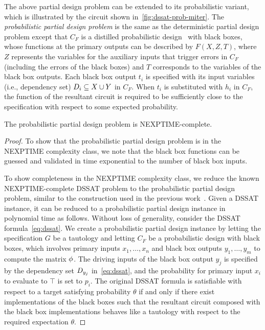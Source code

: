 The above partial design problem can be extended to its probabilistic variant,
which is illustrated by the circuit shown in~\cref{fig:dssat-prob-miter}.
The \textit{probabilistic partial design problem} is the same as the deterministic partial design problem except that
$C_F$ is a distilled probabilistic design~\cite{LeeTC18ProbDesign} with black boxes,
whose functions at the primary outputs can be described by $F(X,Z,T)$,
where $Z$ represents the variables for the auxiliary inputs that trigger errors in $C_F$
(including the errors of the black boxes) and
$T$ corresponds to the variables of the black box outputs.
Each black box output $t_i$ is specified with its input variables (i.e., dependency set)
$D_{i} \subseteq X \cup Y$ in $C_F$.
When $t_i$ is substituted with $h_i$ in $C_F$,
the function of the resultant circuit is required to be sufficiently close to the specification with respect to some expected probability.

\begin{theorem}
    The probabilistic partial design problem is NEXPTIME-complete.
\end{theorem}
\begin{proof}
    To show that the probabilistic partial design problem is in the NEXPTIME complexity class,
    we note that the black box functions can be guessed and validated in time exponential to the number of black box inputs.

    To show completeness in the NEXPTIME complexity class,
    we reduce the known NEXPTIME-complete DSSAT problem to the probabilistic partial design problem,
    similar to the construction used in the previous work~\cite{Gitina2013}.
    Given a DSSAT instance,
    it can be reduced to a probabilistic partial design instance in polynomial time as follows.
    Without loss of generality,
    consider the DSSAT formula~\cref{eq:dssat}.
    We create a probabilistic partial design instance by letting the specification $G$ be a tautology and
    letting $C_F$ be a probabilistic design with black boxes,
    which involves primary inputs $x_1,\ldots,x_n$ and black box outputs $y_1,\ldots,y_m$ to compute the matrix $\phi$.
    The driving inputs of the black box output $y_j$ is specified by the dependency set $D_{y_j}$ in~\cref{eq:dssat},
    and the probability for primary input $x_i$ to evaluate to $\top$ is set to $p_i$.
    The original DSSAT formula is satisfiable with respect to a target satisfying probability $\theta$ if and only if
    there exist implementations of the black boxes such that the resultant circuit composed with the black box implementations behaves like a tautology with respect to the required expectation $\theta$.
\end{proof}


